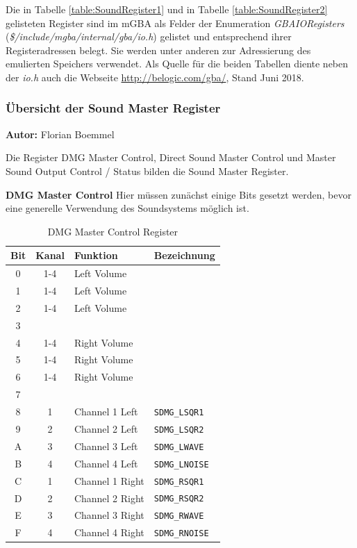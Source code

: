 \documentclass[11pt,a4paper]{scrartcl}
\newcommand{\AutorFlorian} {
    \vspace{-4mm}
    \large \textbf{Autor:} Florian Boemmel \normalsize
    \vspace{2mm}
}
\newcommand{\paratitle}[1] {
    \vspace{5mm}
    \large \textbf{#1} \normalsize
    \vspace{2mm}\newline
}
\begin{document}
Die in Tabelle \ref{table:SoundRegister1} und in Tabelle \ref{table:SoundRegister2} gelisteten Register sind im mGBA als Felder der Enumeration \textit{GBAIORegisters} (\textit{\$/include/mgba/internal/gba/io.h}) gelistet und entsprechend ihrer Registeradressen belegt. Sie werden unter anderen zur Adressierung des emulierten Speichers verwendet. Als Quelle f\"ur die beiden Tabellen diente neben der \textit{io.h} auch die Webseite \url{http://belogic.com/gba/}, Stand Juni 2018.

\newpage


\subsubsection{\"Ubersicht der Sound Master Register}
\AutorFlorian

Die Register DMG Master Control, Direct Sound Master Control und Master Sound Output Control / Status bilden die Sound Master Register.

\paratitle{DMG Master Control} \label{dmgmastercontrol}
Hier m\"ussen zun\"achst einige Bits gesetzt werden, bevor eine generelle Verwendung des Soundsystems m\"oglich ist.

\begin{table}[h]
	\centering
    \begin{tabular}{ c | c | p{10cm} | l } 
	    \textbf{Bit} & \textbf{Kanal} & \textbf{Funktion} & \textbf{Bezeichnung} \\
	    \hline
	    0 & 1-4 & Left Volume & \\
	    \hline
	    1 & 1-4 & Left Volume & \\
	    \hline
	    2 & 1-4 & Left Volume & \\
	    \hline
	    3 & & & \\
	    \hline
	    4 & 1-4 & Right Volume & \\
	    \hline
	    5 & 1-4 & Right Volume & \\
	    \hline
	    6 & 1-4 & Right Volume & \\
	    \hline
	    7 & & & \\
	    \hline
	    8 & 1 & Channel 1 Left & \verb|SDMG_LSQR1| \\
	    \hline
	    9 & 2 & Channel 2 Left & \verb|SDMG_LSQR2| \\
	    \hline
	    A & 3 & Channel 3 Left & \verb|SDMG_LWAVE| \\
	    \hline
	    B & 4 & Channel 4 Left & \verb|SDMG_LNOISE| \\
	    \hline
	    C & 1 & Channel 1 Right & \verb|SDMG_RSQR1| \\
	    \hline
	    D & 2 & Channel 2 Right & \verb|SDMG_RSQR2| \\
	    \hline
	    E & 3 & Channel 3 Right & \verb|SDMG_RWAVE| \\
	    \hline
	    F & 4 & Channel 4 Right & \verb|SDMG_RNOISE| \\
	\end{tabular}
	\caption{DMG Master Control Register}
	\label{table:DmgMasterControlRegister}
\end{table}
\end{document}

